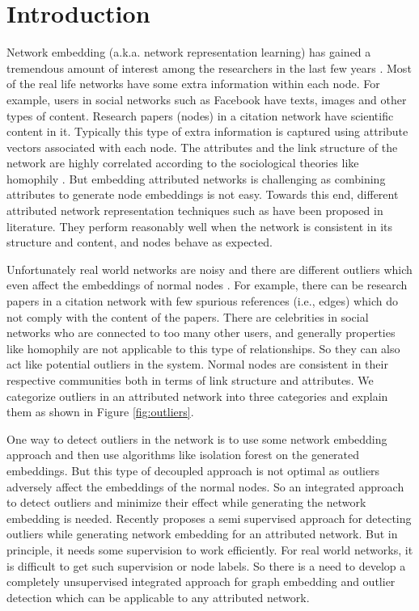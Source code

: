 \documentclass[letterpaper]{article} %
\begin{document}
\section{Introduction}
Network embedding (a.k.a. network representation learning) has gained a tremendous amount of interest among the researchers in the last few years \cite{perozzi2014deepwalk,grover2016node2vec}. Most of the real life networks have some extra information within each node. For example, users in social networks such as Facebook have texts, images and other types of content. Research papers (nodes) in a citation network have scientific content in it. Typically this type of extra information is captured using attribute vectors associated with each node.
The attributes and the link structure of the network are highly correlated according to the sociological theories like homophily \cite{mcpherson2001birds}.
But embedding attributed networks is challenging as combining attributes to generate node embeddings is not easy. Towards this end, different attributed network representation techniques such as \cite{yang2015network,huang2017accelerated,gao2018deep} have been proposed in literature. They perform reasonably well when the network is consistent in its structure and content, and nodes behave as expected.

Unfortunately real world networks are noisy and there are different outliers which even affect the embeddings of normal nodes \cite{liu2017accelerated}. For example, there can be research papers in a citation network with few spurious references (i.e., edges) which do not comply with the content of the papers. There are celebrities in social networks who are connected to too many other users, and generally properties like homophily are not applicable to this type of relationships. So they can also act like potential outliers in the system. Normal nodes are consistent in their respective communities both in terms of link structure and attributes. We categorize outliers in an attributed network into three categories and explain them as shown in Figure \ref{fig:outliers}.

One way to detect outliers in the network is to use some network embedding approach and then use algorithms like isolation forest \cite{liu2008isolation} on the generated embeddings. But this type of decoupled approach is not optimal as outliers adversely affect the embeddings of the normal nodes. So an integrated approach to detect outliers and minimize their effect while generating the network embedding is needed. Recently \cite{liang2018semi} proposes a semi supervised approach for detecting outliers while generating network embedding for an attributed network. But in principle, it needs some supervision to work efficiently. For real world networks, it is difficult to get such supervision or node labels. So there is a need to develop a completely unsupervised integrated approach for graph embedding and outlier detection which can be applicable to any attributed network.
\end{document}
